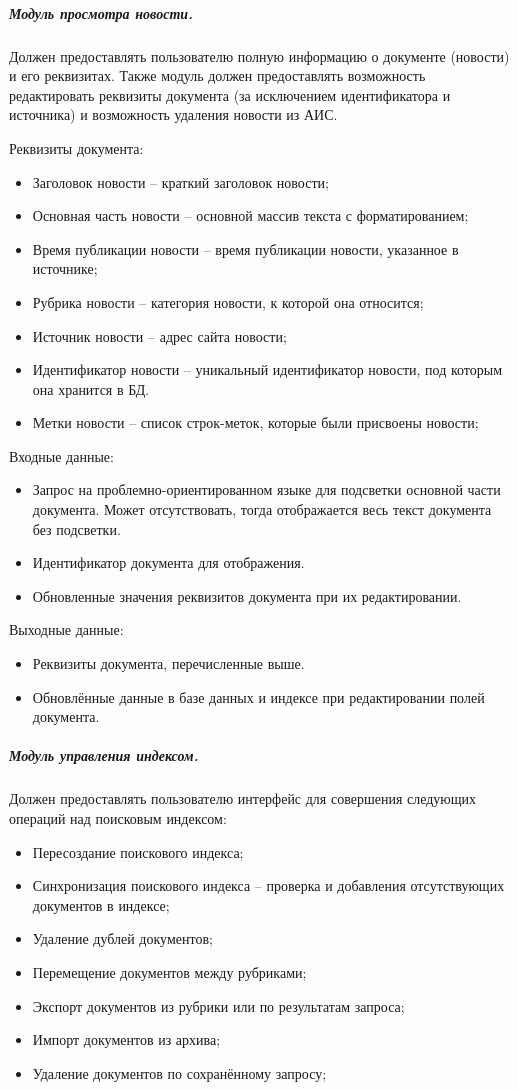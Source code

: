 \subparagraph{Модуль просмотра новости.} \hfill

Должен предоставлять пользователю полную информацию о документе (новости) и его реквизитах. Также модуль должен предоставлять возможность редактировать реквизиты документа (за исключением идентификатора и источника) и возможность удаления новости из АИС.

Реквизиты документа:
\begin{itemize}
\item Заголовок новости -- краткий заголовок новости;
\item Основная часть новости -- основной массив текста с форматированием;
\item Время публикации новости -- время публикации новости, указанное в
источнике;
\item Рубрика новости -- категория новости, к которой она относится;
\item Источник новости -- адрес сайта новости;
\item Идентификатор новости -- уникальный идентификатор новости, под
которым она хранится в БД.
\item Метки новости -- список строк-меток, которые были присвоены новости;
\end{itemize}

Входные данные:
\begin{itemize}
\item Запрос на проблемно-ориентированном языке для подсветки основной части документа. Может отсутствовать, тогда отображается весь текст документа без подсветки.
\item Идентификатор документа для отображения.
\item Обновленные значения реквизитов документа при их редактировании.
\end{itemize}

Выходные данные:
\begin{itemize}
\item Реквизиты документа, перечисленные выше.
\item Обновлённые данные в базе данных и индексе при редактировании полей документа.
\end{itemize}

\subparagraph{Модуль управления индексом.} \hfill

Должен предоставлять пользователю интерфейс для совершения следующих
операций над поисковым индексом:
\begin{itemize}
\item Пересоздание поискового индекса;
\item Синхронизация поискового индекса -- проверка и добавления отсутствующих документов в индексе;
\item Удаление дублей документов;
\item Перемещение документов между рубриками; 
\item Экспорт документов из рубрики или по результатам запроса;
\item Импорт документов из архива;
\item Удаление документов по сохранённому запросу;
\end{itemize}

